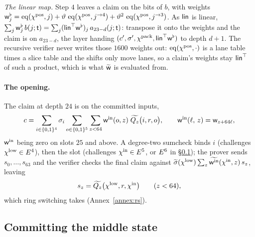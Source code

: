 \emph{The linear map.} Step $4$ leaves a claim on the bits of $b$, with weights $\mathsf{w}^{\flat}_j=\operatorname{eq}(\chi^{\mathrm{pos}},j)+\vartheta\,\operatorname{eq}(\chi^{\mathrm{pos}},j^{\rightarrow 4})+\vartheta^{2}\,\operatorname{eq}(\chi^{\mathrm{pos}},j^{\rightarrow 3})$. As $\mathsf{lin}$ is linear, $\sum_j\mathsf{w}^{\flat}_j\,b(j;\mathsf{t})=\sum_j(\mathsf{lin}^{\top}\mathsf{w}^{\flat})_j\,a_{23-d}(j;\mathsf{t})$: transpose it onto the weights and the claim is on $a_{23-d}$, the layer handing $(c',\sigma',\chi^{\mathrm{pack}},\mathsf{lin}^{\top}\mathsf{w}^{\flat})$ to depth $d+1$. The recursive verifier never writes those $1600$ weights out: $\operatorname{eq}(\chi^{\mathrm{pos}},\cdot)$ is a lane table times a slice table and the shifts only move lanes, so a claim's weights stay $\mathsf{lin}^{\top}$ of such a product, which is what $\widetilde{\mathsf{w}}$ is evaluated from.

\paragraph{The opening.}\label{keccak:openings} The claim at depth $24$ is on the committed inputs,
\begin{equation}\label{keccak:eq:in}
c=\sum_{i\in\{0,1\}^{4}}\sigma_i\sum_{o\in\{0,1\}^{5}}\sum_{z<64}\mathsf{w}^{\mathrm{in}}(o,z)\;\widetilde{Q_z}\bigl(i,r,o\bigr),\qquad
\mathsf{w}^{\mathrm{in}}(\ell,\,z)=\mathsf{w}_{z+64\ell},
\end{equation}
$\mathsf{w}^{\mathrm{in}}$ being zero on slots $25$ and above. A degree-two sumcheck binds $i$ (challenges $\chi^{\mathrm{low}}\in E^{4}$), then the slot (challenges $\chi^{\mathrm{in}}\in E^{5}$, or $E^{6}$ in \S\ref{keccak:segments}); the prover sends $s_0,\dots,s_{63}$ and the verifier checks the final claim against $\widetilde{\sigma}(\chi^{\mathrm{low}})\sum_z\widetilde{\mathsf{w}^{\mathrm{in}}}(\chi^{\mathrm{in}},z)\,s_z$, leaving
\begin{equation}\label{keccak:eq:in-claim}
s_z=\widetilde{Q_z}\bigl(\chi^{\mathrm{low}},r,\chi^{\mathrm{in}}\bigr)\qquad(z<64),
\end{equation}
which ring switching takes (Annex~\ref{annex:rs}).

\subsection{Committing the middle state}\label{keccak:segments}

